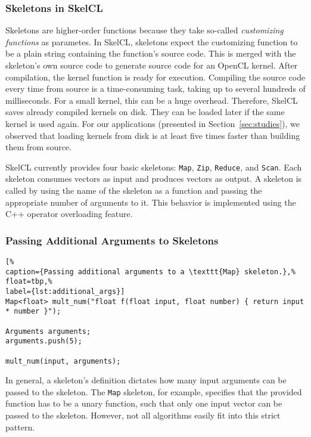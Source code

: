 \subsubsection{Skeletons in SkelCL}

Skeletons are higher-order functions because they take so-called \emph{customizing functions} as parametes.
In SkelCL, skeletons expect the customizing function to be a plain string containing the function's source code.
This is merged with the skeleton's own source code to generate source code for an OpenCL kernel.
After compilation, the kernel function is ready for execution.
Compiling the source code every time from source is a time-consuming task, taking up to several hundreds of milliseconds.
For a small kernel, this can be a huge overhead.
Therefore, SkelCL saves already compiled kernels on disk.
They can be loaded later if the same kernel is used again.
For our applications (presented in Section~\ref{sec:studies}), we observed that loading kernels from disk is at least five times faster than building them from source.

SkelCL currently provides four basic skeletons: \texttt{Map}, \texttt{Zip}, \texttt{Reduce}, and \texttt{Scan}.
Each skeleton consumes vectors as input and produces vectors as output.
A skeleton is called by using the name of the skeleton as a function and passing the appropriate number of arguments to it.
This behavior is implemented using the C++ operator overloading feature.

\subsubsection{Passing Additional Arguments to Skeletons}


\begin{lstlisting}[%
caption={Passing additional arguments to a \texttt{Map} skeleton.},%
float=tbp,%
label={lst:additional_args}]
Map<float> mult_num("float f(float input, float number) { return input * number }");

Arguments arguments;
arguments.push(5);

mult_num(input, arguments);
\end{lstlisting}

In general, a skeleton's definition dictates how many input arguments can be passed to the skeleton.
The \texttt{Map} skeleton, for example, specifies that the provided function has to be a unary function, such that only one input vector can be passed to the skeleton.
However, not all algorithms easily fit into this strict pattern.

